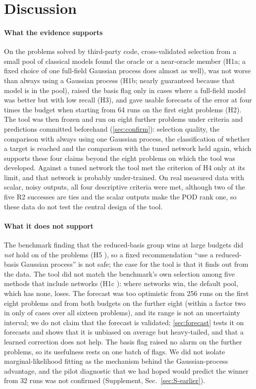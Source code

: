 \section{Discussion}\label{sec:discussion}
\paragraph{What the evidence supports} On the problems solved by third-party code, cross-validated selection from a small pool of classical models found the oracle or a near-oracle member (H1a; a fixed choice of one full-field Gaussian process does almost as well), was not worse than always using a Gaussian process (H1b; nearly guaranteed because that model is in the pool), raised the basis flag only in cases where a full-field model was better but with low recall (H3), and gave usable forecasts of the error at four times the budget when starting from 64 runs on the first eight problems (H2). The tool was then frozen and run on eight further problems under criteria and predictions committed beforehand (\cref{sec:confirm}): selection quality, the comparison with always using one Gaussian process, the classification of whether a target is reached and the comparison with the tuned network held again, which supports these four claims beyond the eight problems on which the tool was developed. Against a tuned network the tool met the criterion of H4 only at its limit, and that network is probably under-trained. On real measured data with scalar, noisy outputs, all four descriptive criteria were met, although two of the five R2 successes are ties and the scalar outputs make the POD rank one, so these data do not test the central design of the tool.
\paragraph{What it does not support} The benchmark finding that the reduced-basis group wins at large budgets did \emph{not} hold on \TpNotClear{} of the \TpN{} problems (H5 \TpVerdict), so a fixed recommendation ``use a reduced-basis Gaussian process'' is not safe; the case for the tool is that it finds out from the data. The tool did not match the benchmark's own selection among five methods that include networks (H1c \SthreeVerdict): where networks win, the default pool, which has none, loses. The forecast was too optimistic from 256 runs on the first eight problems and from both budgets on the further eight (within a factor two in only \SvpBoneShare{} of \SvpBoneN{} cases over all sixteen problems), and its range is not an uncertainty interval; we do not claim that the forecast is validated; \cref{sec:forecast} tests it on \SfAllCases{} forecasts and shows that it is unbiased on average but heavy-tailed, and that a learned correction does not help. The basis flag raised no alarm on the further problems, so its usefulness rests on one batch of flags. We did not isolate marginal-likelihood fitting as the mechanism behind the Gaussian-process advantage, and the pilot diagnostic that we had hoped would predict the winner from 32 runs was not confirmed (Supplement, Sec.~\ref{sec:S-earlier}).
